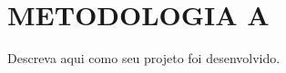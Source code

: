 \section{METODOLOGIA A}
\label{sec:metodologia_a}

Descreva aqui como seu projeto foi desenvolvido. 